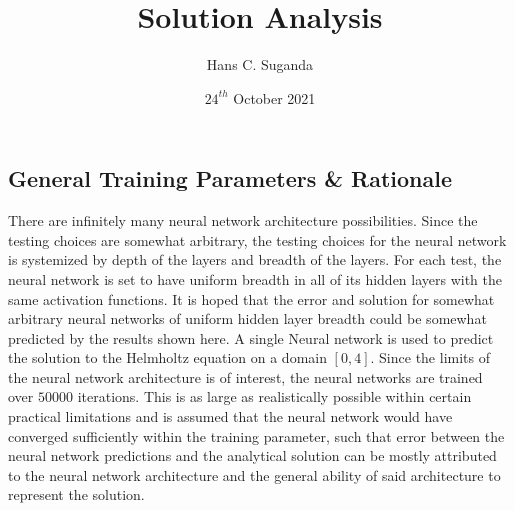 \documentclass[a4paper, 12pt]{report}
\begin{document}
\title{Solution Analysis}
\author{Hans C. Suganda}
\date{$24^{th}$ October 2021}
\maketitle
\newpage


\tableofcontents
\newpage

\begin{center}
\section{General Training Parameters \& Rationale}

There are infinitely many neural network architecture possibilities. Since the testing choices are somewhat arbitrary, the testing choices for the neural network is systemized by depth of the layers and breadth of the layers. For each test, the neural network is set to have uniform breadth in all of its hidden layers with the same activation functions. It is hoped that the error and solution for somewhat arbitrary neural networks of uniform hidden layer breadth could be somewhat predicted by the results shown here. A single Neural network is used to predict the solution to the Helmholtz equation on a domain $[0,4]$. Since the limits of the neural network architecture is of interest, the neural networks are trained over $50 000$ iterations. This is as large as realistically possible within certain practical limitations and is assumed that the neural network would have converged sufficiently within the training parameter, such that error between the neural network predictions and the analytical solution can be mostly attributed to the neural network architecture and the general ability of said architecture to represent the solution.


\end{center}
\end{document}
